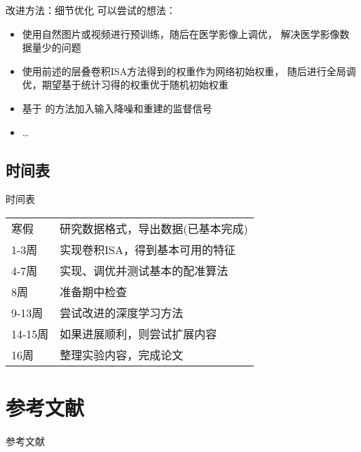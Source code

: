 \documentclass {beamer}
\begin{document}
\begin{frame}{改进方法：细节优化}
    可以尝试的想法：
    \begin{itemize}
        \item 使用自然图片或视频进行预训练，随后在医学影像上调优，
            解决医学影像数据量少的问题
        \item 使用前述的层叠卷积ISA方法得到的权重作为网络初始权重，
            随后进行全局调优，期望基于统计习得的权重优于随机初始权重
        \item 基于\cite{vincent2010stacked}
            的方法加入输入降噪和重建的监督信号
        \item \dots
    \end{itemize}
\end{frame}

\subsection{时间表}
\begin{frame}{时间表}
    \begin{tabular}{ll}
        寒假 & 研究数据格式，导出数据(已基本完成) \\
        1-3周 & 实现卷积ISA，得到基本可用的特征 \\
        4-7周 & 实现、调优并测试基本的配准算法 \\
        8周 & 准备期中检查 \\
        9-13周 & 尝试改进的深度学习方法 \\
        14-15周 & 如果进展顺利，则尝试扩展内容 \\
        16周 & 整理实验内容，完成论文
    \end{tabular}
\end{frame}


\section{ }
\subsection{ }

\section[]{参考文献}
\begin{frame}[allowframebreaks]{参考文献}
    \printbibliography
\end{frame}
\end{document}
